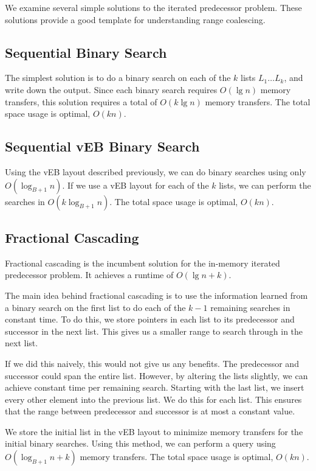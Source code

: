 We examine several simple solutions to the iterated predecessor problem. 
These solutions provide a good template for understanding range coalescing.

\subsection*{Sequential Binary Search}
The simplest solution is to do a binary search on each of the $k$ lists 
$L_1 \ldots L_k$, and write 
down the output. Since each binary search requires $O(\lg n)$ memory transfers, 
this solution requires a total of $O(k \lg n)$ memory transfers. The total space 
usage is optimal, $O(kn)$.

\subsection*{Sequential vEB Binary Search}
Using the vEB layout described previously, we can do binary searches using only 
$O(\log_{B+1} n)$. If we use a vEB layout for each of the $k$ lists, we can perform 
the searches in $O(k \log_{B+1} n)$. The total space usage is optimal, $O(kn)$.

\subsection*{Fractional Cascading}
Fractional cascading is the incumbent solution for the in-memory iterated 
predecessor problem. It achieves a runtime of $O(\lg n + k)$.

The main idea behind fractional cascading is to use the information learned from 
a binary search on the first list to do each of the $k-1$ remaining searches in 
constant time. To do this, we store pointers in each list to its predecessor and 
successor in the next list. This gives us a smaller range to search through in the next list.

If we did this naively, this would not give us any benefits. The predecessor and 
successor could span the entire list. However, by altering the lists slightly, 
we can achieve constant time per remaining search. Starting with the last list, 
we insert every other element into the previous list. We do this for each list. 
This ensures that the range between predecessor and successor is at most a constant value.

We store the initial list in the vEB layout to minimize memory transfers for the 
initial binary searches. Using this method, we can perform a query using 
$O(\log_{B+1} n + k)$ memory transfers. The total space usage is optimal, $O(kn)$.


